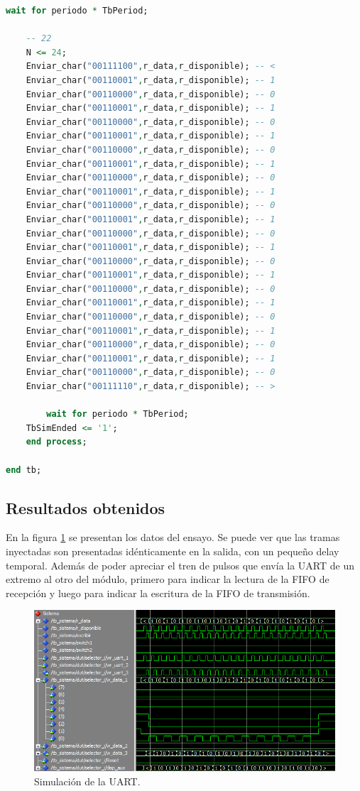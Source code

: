 \begin{lstlisting}[language = vhdl,caption=Testbench del módulo UART,label={lst:test_uart}]
	wait for periodo * TbPeriod;

	-- 22
	N <= 24; 	
	Enviar_char("00111100",r_data,r_disponible); -- < 	
	Enviar_char("00110001",r_data,r_disponible); -- 1 	
	Enviar_char("00110000",r_data,r_disponible); -- 0
 	Enviar_char("00110001",r_data,r_disponible); -- 1 	
	Enviar_char("00110000",r_data,r_disponible); -- 0
	Enviar_char("00110001",r_data,r_disponible); -- 1 	
	Enviar_char("00110000",r_data,r_disponible); -- 0
	Enviar_char("00110001",r_data,r_disponible); -- 1 	
	Enviar_char("00110000",r_data,r_disponible); -- 0
	Enviar_char("00110001",r_data,r_disponible); -- 1 	
	Enviar_char("00110000",r_data,r_disponible); -- 0
	Enviar_char("00110001",r_data,r_disponible); -- 1 	
	Enviar_char("00110000",r_data,r_disponible); -- 0
	Enviar_char("00110001",r_data,r_disponible); -- 1 	
	Enviar_char("00110000",r_data,r_disponible); -- 0
	Enviar_char("00110001",r_data,r_disponible); -- 1 	
	Enviar_char("00110000",r_data,r_disponible); -- 0
	Enviar_char("00110001",r_data,r_disponible); -- 1 	
	Enviar_char("00110000",r_data,r_disponible); -- 0
	Enviar_char("00110001",r_data,r_disponible); -- 1 	
	Enviar_char("00110000",r_data,r_disponible); -- 0
	Enviar_char("00110001",r_data,r_disponible); -- 1 
	Enviar_char("00110000",r_data,r_disponible); -- 0	
	Enviar_char("00111110",r_data,r_disponible); -- >
	
        wait for periodo * TbPeriod;
	TbSimEnded <= '1';
    end process;
	
end tb;

		\end{lstlisting}
			
	\subsection{Resultados obtenidos}
				
		En la figura \ref{fig:Test_UART} se presentan los datos del ensayo. Se puede ver que las tramas inyectadas son presentadas idénticamente en la salida, con un pequeño delay temporal. Además de poder apreciar el tren de pulsos que envía la UART de un extremo al otro del módulo, primero para indicar la lectura de la FIFO de recepción y luego para indicar la escritura de la FIFO de transmisión.
		
		\begin{figure}[h]
		\centering
		\includegraphics[scale=0.7]{./Figures/Test/UART}
			\caption{Simulación de la UART.}
			\label{fig:Test_UART}
		\end{figure}
			
